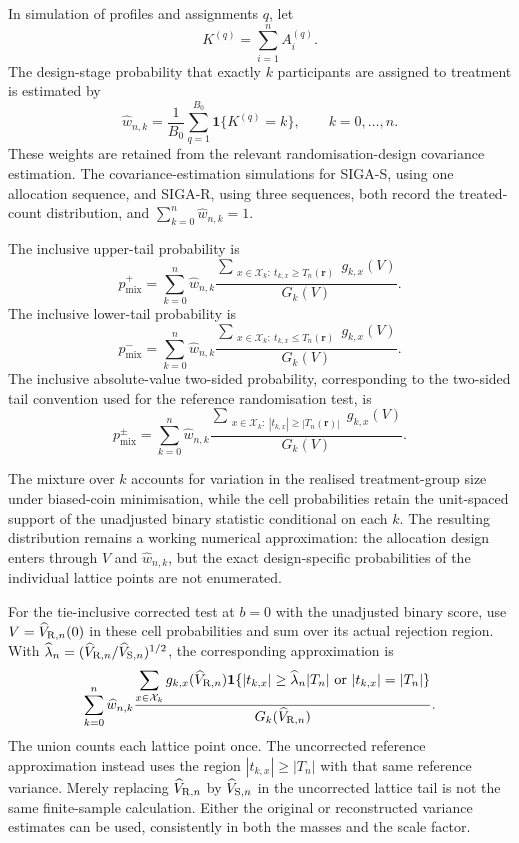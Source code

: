 \documentclass[12pt,a4paper]{article}
\theoremstyle{definition}
\theoremstyle{remark}\newtheorem{remark}{Remark}
\numberwithin{equation}{section}
\begin{document}
In simulation of profiles and assignments $q$, let
\[
K^{(q)}=\sum_{i=1}^nA_i^{(q)}.
\]
The design-stage probability that exactly $k$ participants are assigned to treatment is estimated by
\[
\widehat w_{n,k}
=
\frac1{B_0}
\sum_{q=1}^{B_0}
\mathbf 1\{K^{(q)}=k\},
\qquad
k=0,\ldots,n.
\]
These weights are retained from the relevant randomisation-design covariance estimation. The covariance-estimation simulations for SIGA-S, using one allocation sequence, and SIGA-R, using three sequences, both record the treated-count distribution, and $\sum_{k=0}^n\widehat w_{n,k}=1$.

The inclusive upper-tail probability is
\begin{equation}\label{eq:supp-lattice-upper}
p_{\mathrm{mix}}^{+}
=
\sum_{k=0}^n\widehat w_{n,k}
\frac{\displaystyle\sum_{\substack{x\in\mathcal X_k:\ t_{k,x}\ge T_n(\bm r)}}g_{k,x}(V)}{G_k(V)}.
\end{equation}
The inclusive lower-tail probability is
\begin{equation}\label{eq:supp-lattice-lower}
p_{\mathrm{mix}}^{-}
=
\sum_{k=0}^n\widehat w_{n,k}
\frac{\displaystyle\sum_{\substack{x\in\mathcal X_k:\ t_{k,x}\le T_n(\bm r)}}g_{k,x}(V)}{G_k(V)}.
\end{equation}
The inclusive absolute-value two-sided probability, corresponding to the two-sided tail convention used for the reference randomisation test, is
\begin{equation}\label{eq:supp-lattice-pvalue}
p_{\mathrm{mix}}^{\pm}
=
\sum_{k=0}^n\widehat w_{n,k}
\frac{\displaystyle\sum_{\substack{x\in\mathcal X_k:\ |t_{k,x}|\ge |T_n(\bm r)|}}g_{k,x}(V)}{G_k(V)}.
\end{equation}

The mixture over $k$ accounts for variation in the realised treatment-group size under biased-coin minimisation, while the cell probabilities retain the unit-spaced support of the unadjusted binary statistic conditional on each $k$. The resulting distribution remains a working numerical approximation: the allocation design enters through $V$ and $\widehat w_{n,k}$, but the exact design-specific probabilities of the individual lattice points are not enumerated.


For the tie-inclusive corrected test at $b=0$ with the unadjusted binary score, use $V=\widehat V_{{\rm R},n}(0)$ in these cell probabilities and sum over its actual rejection region. With $\widehat\lambda_n=(\widehat V_{{\rm R},n}/\widehat V_{{\rm S},n})^{1/2}$, the corresponding approximation is
\[
 \sum_{k=0}^n\widehat w_{n,k}
 \frac{\displaystyle\sum_{x\in\mathcal X_k}g_{k,x}(\widehat V_{{\rm R},n})
 \mathbf1\{|t_{k,x}|\ge\widehat\lambda_n|T_n|\ \text{or}\ |t_{k,x}|=|T_n|\}}
 {G_k(\widehat V_{{\rm R},n})}.
\]
The union counts each lattice point once. The uncorrected reference approximation instead uses the region $|t_{k,x}|\ge|T_n|$ with that same reference variance. Merely replacing $\widehat V_{{\rm R},n}$ by $\widehat V_{{\rm S},n}$ in the uncorrected lattice tail is not the same finite-sample calculation. Either the original or reconstructed variance estimates can be used, consistently in both the masses and the scale factor.
\end{document}
